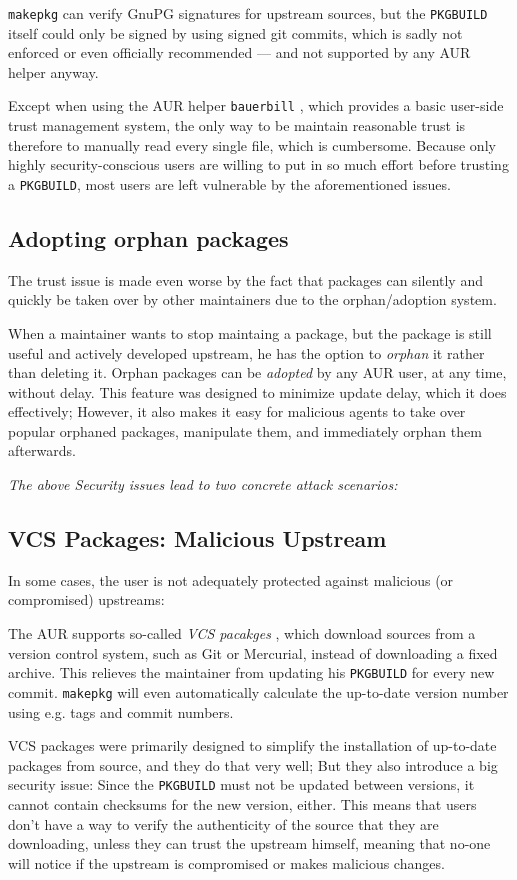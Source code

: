 \texttt{makepkg} can verify GnuPG signatures for upstream sources, but the \texttt{PKGBUILD} itself could only be signed by using signed git commits, which is sadly not enforced or even officially recommended --- and not supported by any AUR helper anyway.

Except when using the AUR helper \texttt{bauerbill} \cite{bauerbill}, which provides a basic user-side trust management system, the only way to be maintain reasonable trust is therefore to manually read every single file, which is cumbersome.
Because only highly security-conscious users are willing to put in so much effort before trusting a \texttt{PKGBUILD}, most users are left vulnerable by the aforementioned issues.

\subsection*{Adopting orphan packages}
The trust issue is made even worse by the fact that packages can silently and quickly be taken over by other maintainers due to the orphan/adoption system.

When a maintainer wants to stop maintaing a package, but the package is still useful and actively developed upstream, he has the option to \emph{orphan} it rather than deleting it.
Orphan packages can be \emph{adopted} by any AUR user, at any time, without delay.
This feature was designed to minimize update delay, which it does effectively; However, it also makes it easy for malicious agents to take over popular orphaned packages, manipulate them, and immediately orphan them afterwards.

\emph{The above Security issues lead to two concrete attack scenarios:}

\subsection*{VCS Packages: Malicious Upstream}
In some cases, the user is not adequately protected against malicious (or compromised) upstreams:

The AUR supports so-called \emph{VCS pacakges} \cite{wiki:VCSPackages}, which download sources from a version control system, such as Git or Mercurial, instead of downloading a fixed archive. This relieves the maintainer from updating his \texttt{PKGBUILD} for every new commit.
\texttt{makepkg} will even automatically calculate the up-to-date version number using e.g. tags and commit numbers.

VCS packages were primarily designed to simplify the installation of up-to-date packages from source, and they do that very well; But they also introduce a big security issue:
Since the \texttt{PKGBUILD} must not be updated between versions, it cannot contain checksums for the new version, either.
This means that users don't have a way to verify the authenticity of the source that they are downloading, unless they can trust the upstream himself, meaning that no-one will notice if the upstream is compromised or makes malicious changes.

